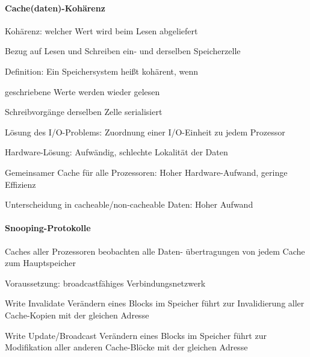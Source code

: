 \documentclass[10pt,landscape]{article}
\begin{document}
\begin{multicols}{3}
  \paragraph{Cache(daten)-Kohärenz}
  \begin{itemize*}
    \item Kohärenz: welcher Wert wird beim Lesen abgeliefert
    \item Bezug auf Lesen und Schreiben ein- und derselben Speicherzelle
    \item Definition: Ein Speichersystem heißt kohärent, wenn
    \begin{itemize*}
      \item geschriebene Werte werden wieder gelesen
      \item Schreibvorgänge derselben Zelle serialisiert
    \end{itemize*}
    \item Lösung des I/O-Problems: Zuordnung einer I/O-Einheit zu jedem Prozessor
    \item Hardware-Lösung: Aufwändig, schlechte Lokalität der Daten
    \item Gemeinsamer Cache für alle Prozessoren: Hoher Hardware-Aufwand, geringe Effizienz
    \item Unterscheidung in cacheable/non-cacheable Daten: Hoher Aufwand
  \end{itemize*}
  
  \paragraph{Snooping-Protokolle}
  \begin{itemize*}
    \item Caches aller Prozessoren beobachten alle Daten- übertragungen von jedem Cache zum Hauptspeicher
    \item Voraussetzung: broadcastfähiges Verbindungsnetzwerk
  \end{itemize*}
  \begin{description*}
    \item[Write Invalidate] Verändern eines Blocks im Speicher führt zur Invalidierung aller Cache-Kopien mit der gleichen Adresse
    \item[Write Update/Broadcast] Verändern eines Blocks im Speicher führt zur Modifikation aller anderen Cache-Blöcke mit der gleichen Adresse
  \end{description*}
  

\end{multicols}
\end{document}
